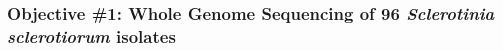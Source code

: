 \documentclass[12pt,letterpaper]{article}
\begin{document}
 
 
 
 



\subsubsection{Objective \#1: Whole Genome Sequencing of 96 \textit{Sclerotinia sclerotiorum} isolates}
\end{document}
